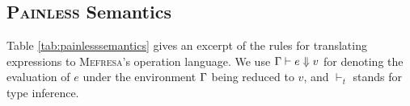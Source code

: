 				
		
		
		
		
		
		

\subsection{\textsc{Painless} Semantics}
\label{sub:painlesssemantics}
	
		
	Table \ref{tab:painlesssemantics} gives an excerpt %
	of the rules for translating expressions to \textsc{Mefresa}'s \textsf{operation} language.	
	We use $\Gamma \vdash e \Downarrow v$ for denoting
	the evaluation of $e$ under the environment $\Gamma$ being reduced to $v$, and $\vdash_t$ stands for
	type inference. %


